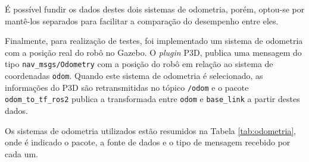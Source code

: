 \documentclass[repeatfields,xlists,xpacks,oneside,yearsonly]{ufrgscca}
\begin{document}
É possível fundir os dados destes dois sistemas de odometria,
porém, optou-se por mantê-los separados para facilitar a comparação
do desempenho entre eles.

Finalmente, para realização de testes, foi implementado um sistema de
odometria com a posição real do robô no Gazebo. O \textit{plugin}
P3D, publica uma mensagem do tipo \texttt{nav\_msgs/Odometry} com a
posição do robô em relação ao sistema de coordenadas \texttt{odom}.
Quando este sistema de odometria é selecionado, as informações do P3D
são retransmitidas no tópico \texttt{/odom} e o pacote
\texttt{odom\_to\_tf\_ros2} publica a transformada entre
\texttt{odom} e \texttt{base\_link} a partir destes dados.

Os sistemas de odometria utilizados estão resumidos na Tabela
\ref{tab:odometria}, onde é indicado o pacote, a fonte de dados e o
tipo de mensagem recebido por cada um.
\end{document}
